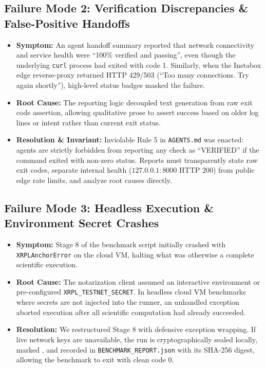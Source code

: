 \documentclass[11pt,a4paper]{article}
\begin{document}
\subsection{Failure Mode 2: Verification Discrepancies \& False-Positive Handoffs}
\begin{itemize}
    \item \textbf{Symptom:} An agent handoff summary reported that network connectivity and service health were ``100\% verified and passing'', even though the underlying \texttt{curl} process had exited with code 1. Similarly, when the Instabox edge reverse-proxy returned HTTP 429/503 (``Too many connections. Try again shortly''), high-level status badges masked the failure.
    \item \textbf{Root Cause:} The reporting logic decoupled text generation from raw exit code assertion, allowing qualitative prose to assert success based on older log lines or intent rather than current exit status.
    \item \textbf{Resolution \& Invariant:} Inviolable Rule 5 in \texttt{AGENTS.md} was enacted: agents are strictly forbidden from reporting any check as ``VERIFIED'' if the command exited with non-zero status. Reports must transparently state raw exit codes, separate internal health ($127.0.0.1:8000$ HTTP 200) from public edge rate limits, and analyze root causes directly.
\end{itemize}

\subsection{Failure Mode 3: Headless Execution \& Environment Secret Crashes}
\begin{itemize}
    \item \textbf{Symptom:} Stage 8 of the benchmark script initially crashed with \texttt{XRPLAnchorError} on the cloud VM, halting what was otherwise a complete scientific execution.
    \item \textbf{Root Cause:} The notarization client assumed an interactive environment or pre-configured \texttt{XRPL\_TESTNET\_SECRET}. In headless cloud VM benchmarks where secrets are not injected into the runner, an unhandled exception aborted execution after all scientific computation had already succeeded.
    \item \textbf{Resolution:} We restructured Stage 8 with defensive exception wrapping. If live network keys are unavailable, the run is cryptographically sealed locally, marked , and recorded in \texttt{BENCHMARK\_REPORT.json} with its SHA-256 digest, allowing the benchmark to exit with clean code 0.
\end{itemize}
\end{document}
